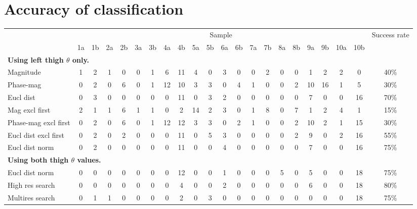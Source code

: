 \section{Accuracy of classification}

\begin{landscape}
	\begin{table}[ht]
		\centering
		\begin{tabular}{|l|c@{ }c|c@{ }c|c@{ }c|c@{ }c|c@{ }c|c@{ }c|c@{ }c|c@{ }c|c@{ }c|c@{ }c|c|}
			\hline
			& \multicolumn{20}{|c|}{Sample} & Success rate \\
			& 1a & 1b & 2a & 2b & 3a & 3b & 4a & 4b & 5a & 5b & 6a & 6b & 7a & 7b & 8a & 8b & 9a & 9b & 10a & 10b & \\
			
			\hline
			\multicolumn{22}{|l|}{\textbf{Using left thigh $\theta$ only.}} \\
			Magnitude                  & 1 & 2 & 1 & 0 & 0 & 1 & 6 & 11 & 4 & 0 & 3 & 0 & 0 & 2 & 0 & 0 & 1 & 2 & 2 & 0 & 40\% \\
			Phase-mag                  & 0 & 2 & 0 & 6 & 0 & 1 & 12 & 10 & 3 & 3 & 0 & 4 & 1 & 0 & 0 & 2 & 10 & 16 & 1 & 5 & 30\% \\
			Eucl dist                  & 0 & 3 & 0 & 0 & 0 & 0 & 0 & 11 & 0 & 3 & 2 & 0 & 0 & 0 & 0 & 0 & 7 & 0 & 0 & 16 & 70\% \\
			Mag excl first             & 2 & 1 & 1 & 6 & 1 & 1 & 0 & 2 & 14 & 2 & 3 & 0 & 1 & 8 & 0 & 7 & 1 & 2 & 4 & 1 & 15\% \\
			Phase-mag excl first       & 0 & 2 & 0 & 6 & 0 & 1 & 12 & 12 & 3 & 3 & 0 & 2 & 1 & 0 & 0 & 2 & 10 & 2 & 1 & 15 & 30\% \\
			Eucl dist excl first       & 0 & 2 & 0 & 2 & 0 & 0 & 0 & 11 & 0 & 5 & 3 & 0 & 0 & 0 & 0 & 2 & 9 & 0 & 2 & 16 & 55\% \\
			Eucl dist norm             & 0 & 2 & 0 & 0 & 0 & 0 & 0 & 11 & 0 & 0 & 4 & 0 & 0 & 0 & 0 & 0 & 7 & 0 & 0 & 16 & 75\% \\
			
			\hline
			\multicolumn{22}{|l|}{\textbf{Using both thigh $\theta$ values.}} \\
			Eucl dist norm             & 0 & 0 & 0 & 0 & 0 & 0 & 0 & 12 & 0 & 0 & 1 & 0 & 0 & 0 & 5 & 0 & 5 & 0 & 0 & 18 & 75\% \\
			High res search            & 0 & 0 & 0 & 0 & 0 & 0 & 0 & 4 & 0 & 0 & 2 & 0 & 0 & 0 & 0 & 0 & 6 & 0 & 0 & 18 & 80\% \\
			Multires search            & 0 & 1 & 1 & 0 & 0 & 0 & 0 & 2 & 0 & 3 & 0 & 0 & 0 & 0 & 0 & 0 & 0 & 0 & 0 & 18 & 75\% \\
			

\end{tabular}
\end{table}
\end{landscape}
